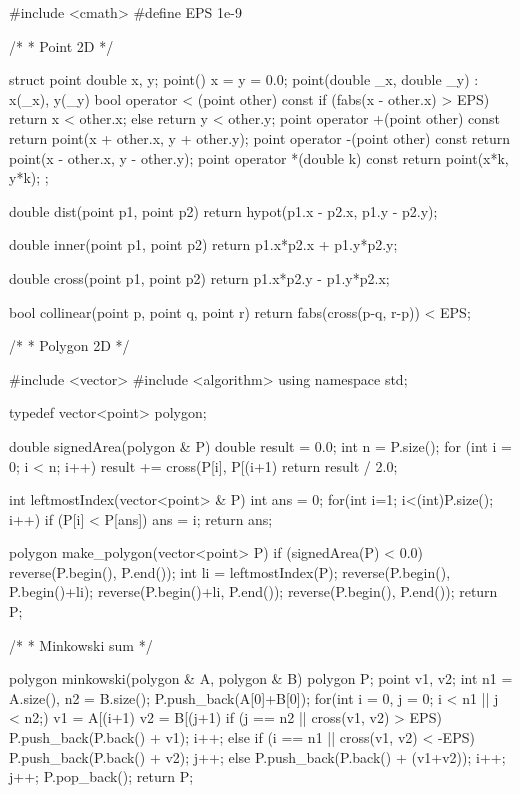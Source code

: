 \documentclass[11pt]{article}
\begin{document}
\begingroup\scriptsize
\begin{vncode}
#include <cmath>
#define EPS 1e-9

/*
 * Point 2D
 */

struct point {
	double x, y;
	point() { x = y = 0.0; }
	point(double _x, double _y) : x(_x), y(_y) {}
	bool operator < (point other) const {
		if (fabs(x - other.x) > EPS) return x < other.x;
		else return y < other.y;
	}
	point operator +(point other) const {
		return point(x + other.x, y + other.y);
	}
	point operator -(point other) const {
		return point(x - other.x, y - other.y);
	}
	point operator *(double k) const {
		return point(x*k, y*k);
	}
};

double dist(point p1, point p2) {
	return hypot(p1.x - p2.x, p1.y - p2.y);
}

double inner(point p1, point p2) {
	return p1.x*p2.x + p1.y*p2.y;
}

double cross(point p1, point p2) {
	return p1.x*p2.y - p1.y*p2.x;
}

bool collinear(point p, point q, point r) {
	return fabs(cross(p-q, r-p)) < EPS;
}

/*
 * Polygon 2D
 */

#include <vector>
#include <algorithm>
using namespace std;

typedef vector<point> polygon;

double signedArea(polygon & P) {
	double result = 0.0;
	int n = P.size();
	for (int i = 0; i < n; i++) {
		result += cross(P[i], P[(i+1)%
	}
	return result / 2.0;
}

int leftmostIndex(vector<point> & P) {
	int ans = 0;
	for(int i=1; i<(int)P.size(); i++) {
		if (P[i] < P[ans]) ans = i;
	}
	return ans;
}

polygon make_polygon(vector<point> P) {
	if (signedArea(P) < 0.0) reverse(P.begin(), P.end());
	int li = leftmostIndex(P);
	reverse(P.begin(), P.begin()+li);
	reverse(P.begin()+li, P.end());
	reverse(P.begin(), P.end());
	return P;
}

/*
 * Minkowski sum
 */

polygon minkowski(polygon & A, polygon & B) {
	polygon P; point v1, v2;
	int n1 = A.size(), n2 = B.size();
	P.push_back(A[0]+B[0]);
	for(int i = 0, j = 0; i < n1 || j < n2;) {
		v1 = A[(i+1)%
		v2 = B[(j+1)%
		if (j == n2 || cross(v1, v2) > EPS) {
			P.push_back(P.back() + v1); i++;
		}
		else if (i == n1 || cross(v1, v2) < -EPS) {
			P.push_back(P.back() + v2); j++;
		}
		else {
			P.push_back(P.back() + (v1+v2));
			i++; j++;
		}
	}
	P.pop_back();
	return P;
}


\end{vncode}
\end{document}
